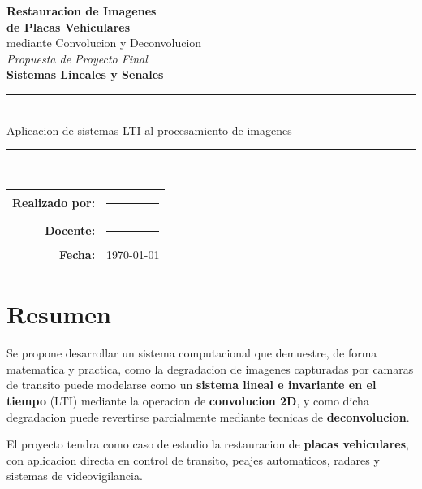 \documentclass[11pt,a4paper]{article}
\begin{document}
\begin{titlepage}
    \centering
    \vspace*{2cm}

    {\LARGE\bfseries\color{azulprofundo} Restauracion de Imagenes \\[0.3em]
    de Placas Vehiculares}\\[0.8em]
    {\Large mediante Convolucion y Deconvolucion}\\[2.5cm]

    {\large\textit{Propuesta de Proyecto Final}}\\[0.5em]
    {\large\textbf{Sistemas Lineales y Senales}}\\[3cm]

    \rule{0.6\textwidth}{0.5pt}\\[0.8em]
    {\large Aplicacion de sistemas LTI al procesamiento de imagenes}\\
    \rule{0.6\textwidth}{0.5pt}\\[3cm]

    \begin{tabular}{rl}
        \textbf{Realizado por:} & \rule{6cm}{0.4pt} \\
        \textbf{Docente:}       & \rule{6cm}{0.4pt} \\
        \textbf{Fecha:}         & \today \\
    \end{tabular}

    \vfill
\end{titlepage}

\section{Resumen}

Se propone desarrollar un sistema computacional que demuestre, de forma matematica y practica, como la degradacion de imagenes capturadas por camaras de transito puede modelarse como un \textbf{sistema lineal e invariante en el tiempo} (LTI) mediante la operacion de \textbf{convolucion 2D}, y como dicha degradacion puede revertirse parcialmente mediante tecnicas de \textbf{deconvolucion}.

El proyecto tendra como caso de estudio la restauracion de \textbf{placas vehiculares}, con aplicacion directa en control de transito, peajes automaticos, radares y sistemas de videovigilancia.

\end{document}
